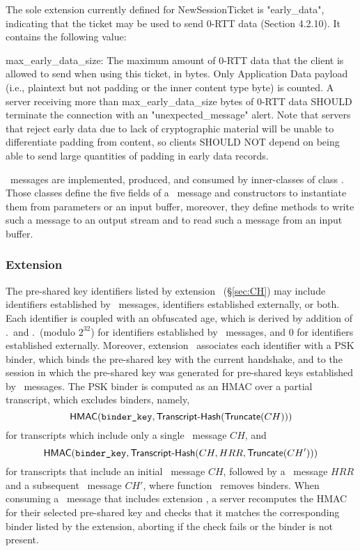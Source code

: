    The sole extension currently defined for NewSessionTicket is
   "early_data", indicating that the ticket may be used to send 0-RTT
   data (Section 4.2.10).  It contains the following value:

   max_early_data_size:  The maximum amount of 0-RTT data that the
      client is allowed to send when using this ticket, in bytes.  Only
      Application Data payload (i.e., plaintext but not padding or the
      inner content type byte) is counted.  A server receiving more than
      max_early_data_size bytes of 0-RTT data SHOULD terminate the
      connection with an "unexpected_message" alert.  Note that servers
      that reject early data due to lack of cryptographic material will
      be unable to differentiate padding from content, so clients
      SHOULD NOT depend on being able to send large quantities of
      padding in early data records.




\begin{tcolorbox}
\NewSessionTicket\ messages are implemented, produced, and consumed by inner-classes of 
class . Those classes define the five fields of a \NewSessionTicket\ 
message and constructors to instantiate them from parameters or an input buffer, moreover,
they define methods to write such a message to an output stream and to read such a message 
from an input buffer.
\end{tcolorbox}

\subsubsection*{Extension \TLSpsk}

The pre-shared key identifiers listed by extension \TLSpsk\ (\S\ref{sec:CH}) may include 
identifiers established by \NewSessionTicket\ messages, identifiers established %
externally,
or both. Each identifier is coupled with an obfuscated age, which is derived by addition of 
\NewSessionTicket.\TLSticketLifetime\ and \NewSessionTicket.\TLSticketAgeAdd\ (modulo $2^{32}$)
for identifiers established by \NewSessionTicket\ messages, and $0$ for identifiers established
externally.
Moreover, extension \TLSpsk\ associates each identifier with a PSK binder, 
which binds the pre-shared key with the current handshake, and to the session in which the 
pre-shared key was generated for pre-shared keys established by \NewSessionTicket\ messages.
The PSK binder is computed as an HMAC over a partial transcript, which excludes binders, 
namely,
\[
  \textsf{HMAC}(\texttt{binder\_key},\textsf{Transcript-Hash}(\textsf{Truncate}(CH)))
\]
for transcripts which include only a single \ClientHello\ message $CH$, and
\[
  \textsf{HMAC}(\texttt{binder\_key},\textsf{Transcript-Hash}(CH,HRR,\textsf{Truncate}(CH')))
\]
for transcripts that include an initial \ClientHello\ message $CH$, followed 
by a \HelloRetryRequest\ message $HRR$ and a subsequent \ClientHello\ message $CH'$,
where function \Truncate\ removes binders. 
%
When consuming a \ClientHello\ message that includes extension \TLSpsk, a server recomputes 
the HMAC for their selected pre-shared key and checks that it matches the corresponding binder 
listed by the extension, aborting if the check fails or the binder is not present.

